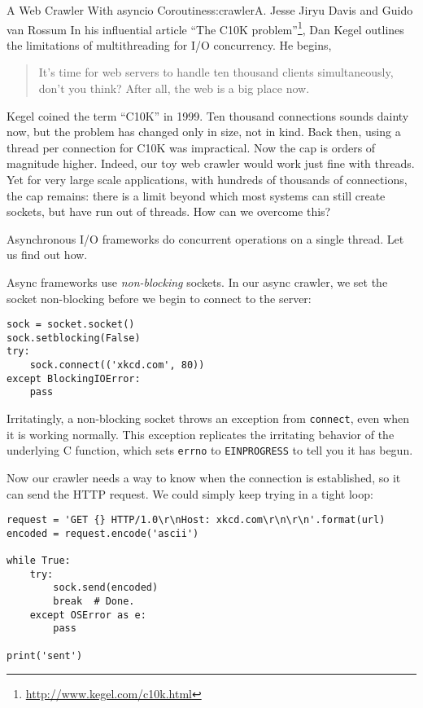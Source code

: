 \begin{aosachapter}{A Web Crawler With asyncio Coroutines}{s:crawler}{A. Jesse Jiryu Davis and Guido van Rossum}
In his influential article ``The C10K problem''\footnote{\url{http://www.kegel.com/c10k.html}},
Dan Kegel outlines the limitations of multithreading for I/O
concurrency. He begins,

\begin{quote}
It's time for web servers to handle ten thousand clients simultaneously,
don't you think? After all, the web is a big place now.
\end{quote}

Kegel coined the term ``C10K'' in 1999. Ten thousand connections sounds
dainty now, but the problem has changed only in size, not in kind. Back
then, using a thread per connection for C10K was impractical. Now the
cap is orders of magnitude higher. Indeed, our toy web crawler would
work just fine with threads. Yet for very large scale applications, with
hundreds of thousands of connections, the cap remains: there is a limit
beyond which most systems can still create sockets, but have run out of
threads. How can we overcome this?

\label{async}

Asynchronous I/O frameworks do concurrent operations on a single thread.
Let us find out how.

Async frameworks use \emph{non-blocking} sockets. In our async crawler,
we set the socket non-blocking before we begin to connect to the server:

\begin{verbatim}
sock = socket.socket()
sock.setblocking(False)
try:
    sock.connect(('xkcd.com', 80))
except BlockingIOError:
    pass
\end{verbatim}

Irritatingly, a non-blocking socket throws an exception from
\texttt{connect}, even when it is working normally. This exception
replicates the irritating behavior of the underlying C function, which
sets \texttt{errno} to \texttt{EINPROGRESS} to tell you it has begun.

Now our crawler needs a way to know when the connection is established,
so it can send the HTTP request. We could simply keep trying in a tight
loop:

\begin{verbatim}
request = 'GET {} HTTP/1.0\r\nHost: xkcd.com\r\n\r\n'.format(url)
encoded = request.encode('ascii')

while True:
    try:
        sock.send(encoded)
        break  # Done.
    except OSError as e:
        pass

print('sent')
\end{verbatim}


\end{aosachapter}

